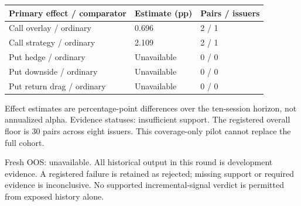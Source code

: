 \documentclass[11pt,letterpaper]{article}
\begin{document}
\begin{tabular}{@{}p{}p{}p{}@{}}
\toprule
\textbf{Primary effect / comparator} & \textbf{Estimate (pp)} & \textbf{Pairs / issuers} \\
\midrule
Call overlay / ordinary & 0.696 & 2 / 1 \\
Call strategy / ordinary & 2.109 & 2 / 1 \\
Put hedge / ordinary & Unavailable & 0 / 0 \\
Put downside / ordinary & Unavailable & 0 / 0 \\
Put return drag / ordinary & Unavailable & 0 / 0 \\
\bottomrule
\end{tabular}
\par\smallskip
Effect estimates are percentage-point differences over the ten-session horizon, not annualized alpha. Evidence statuses: insufficient support. The registered overall floor is 30 pairs across eight issuers. This coverage-only pilot cannot replace the full cohort.

Fresh OOS: unavailable. All historical output in this round is development evidence. A registered failure is retained as rejected; missing support or required evidence is inconclusive. No supported incremental-signal verdict is permitted from exposed history alone.


\clearpage
\end{document}

